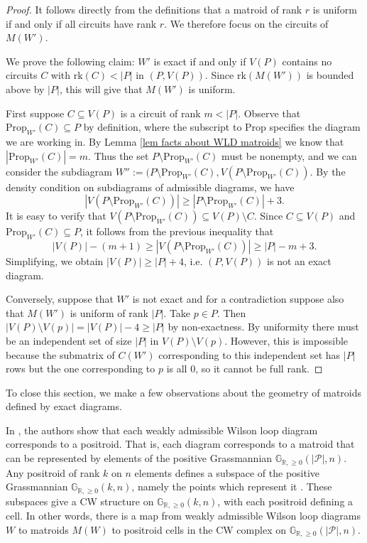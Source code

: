 \documentclass[11pt]{article}
\newcommand{\hlfix}[2]{\texthl{#1}\todo{#2}}
\newcommand{\R}{\mathbb{R}}
\newcommand{\Gr}{\mathbb{G}_{\R, \geq 0}}
\newcommand{\rk}{\textrm{rk} }
\newcommand{\cP}{\mathcal{P}}
\newcommand{\Prop}{\textrm{Prop}}
\theoremstyle{remark}
\theoremstyle{definition}
\begin{document}
\begin{proof}
It follows directly from the definitions that a matroid of rank $r$ is uniform if and only if all circuits have rank $r$. We therefore focus on the circuits of $M(W')$.

We prove the following claim: $W'$ is exact if and only if $V(P)$ contains no circuits $C$ with $\rk (C)< |P|$ in $(P, V(P))$. Since $\rk(M(W'))$ is bounded above by $|P|$, this will give that  $M(W')$ is uniform.

First suppose $C \subseteq V(P)$ is a circuit of rank $m < |P|$. Observe that $\Prop_{W'}(C)\subseteq P$ by definition, where the subscript to $\Prop$ specifies the diagram we are working in. By Lemma \ref{lem facts about WLD matroids} we know that ${|\Prop_{W'}(C)| = m}$. Thus the set $P \setminus \Prop_{W'}(C)$ must be nonempty, and we can consider the subdiagram $W'':= (P\setminus \Prop_{W'}(C),V(P\setminus\Prop_{W'}(C))$. By the density condition on subdiagrams of admissible diagrams, we have
\[|V(P\setminus\Prop_{W'}(C))| \geq |P\setminus\Prop_{W'}(C)| + 3.\]
It is easy to verify that $V(P\setminus\Prop_{W'}(C)) \subseteq V(P)\setminus C$. Since $C \subseteq V(P)$ and $\Prop_{W'}(C) \subseteq P$, it follows from the previous inequality that
\[|V(P)| - (m+1) \geq |V(P\setminus\Prop_{W'}(C))| \geq |P| - m + 3.\]
Simplifying, we obtain $|V(P)| \geq |P| + 4$, i.e. $(P,V(P))$ is not an exact diagram.

Conversely, suppose that $W'$ is not exact and for a contradiction suppose also that $M(W')$ is uniform of rank $|P|$.  Take $p \in P$.  Then $|V(P)\setminus V(p)| = |V(P)| - 4 \geq |P|$ by non-exactness.  By uniformity there must be an independent set of size $|P|$ in $V(P)\setminus V(p)$.  However, this is impossible because the submatrix of $C(W')$ corresponding to this independent set has $|P|$ rows but the one corresponding to $p$ is all $0$, so it cannot be full rank.
\end{proof}

To close this section, we make a few observations about the geometry of matroids defined by exact diagrams.

In \cite[Theorem 3.39]{wilsonloop}, the authors show that each weakly admissible Wilson loop diagram corresponds to a positroid. That is, each diagram corresponds to a matroid that can be represented by elements of the positive Grassmannian $\Gr(|\cP|, n)$. Any positroid of rank $k$ on $n$ elements defines a subspace of the positive Grassmannian $\Gr(k, n)$, namely the points which represent it \cite{Postnikov}. These subspaces give a CW structure on $\Gr(k,n)$, with each positroid defining a cell.  In other words, there is a map from weakly admissible Wilson loop diagrams $W$ to matroids $M(W)$ to positroid cells in the CW complex on $\Gr(|\cP|, n)$.
\end{document}
